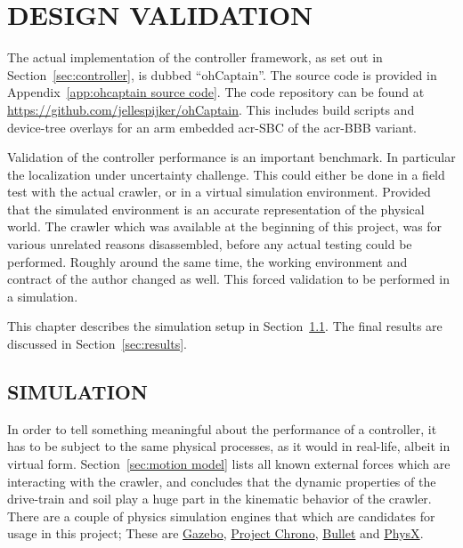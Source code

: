 

\chapter{DESIGN VALIDATION}\label{chap:design validation}

The actual implementation of the controller framework, as set out in Section~\ref{sec:controller}, is dubbed
``ohCaptain''. The source code is provided in Appendix~\ref{app:ohcaptain source code}. The code repository can be found
at \url{https://github.com/jellespijker/ohCaptain}. This includes build scripts and device-tree overlays for an arm
embedded \gls{acr-SBC} of the \gls{acr-BBB} variant.

Validation of the controller performance is an important benchmark. In particular the localization under uncertainty
challenge. This could either be done in a field test with the actual crawler, or in a virtual simulation environment.
Provided that the simulated environment is an accurate representation of the physical world. The crawler which was
available at the beginning of this project, was for various unrelated reasons disassembled, before any actual testing
could be performed. Roughly around the same time, the working environment and contract of the author changed as well.
This forced validation to be performed in a simulation.

\noindent This chapter describes the simulation setup in Section~\ref{sec:simulation}. The final results are discussed
in Section~\ref{sec:results}.


\section{SIMULATION}\label{sec:simulation}

In order to tell something meaningful about the performance of a controller, it has to be subject to the same physical
processes, as it would in real-life, albeit in virtual form. Section~\ref{sec:motion model} lists all known external
forces which are interacting with the crawler, and concludes that the dynamic properties of the drive-train and soil
play a huge part in the kinematic behavior of the crawler. There are a couple of physics simulation engines that which
are candidates for usage in this project; These are \href{http://gazebosim.org/}{Gazebo},
\href{https://projectchrono.org/}{Project Chrono}, \href{https://pybullet.org/wordpress/}{Bullet} and
\href{https://developer.nvidia.com/gameworks-physx-overview}{PhysX}.

